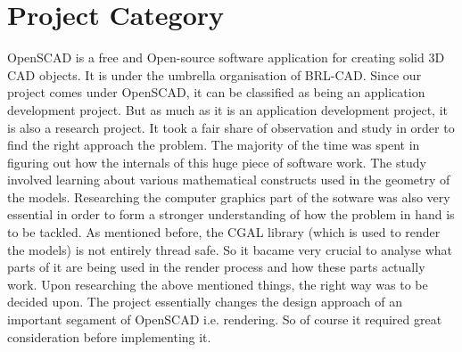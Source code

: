 \section{Project Category}
OpenSCAD is a free and Open-source software application for creating solid 3D CAD objects. It is under the umbrella organisation of BRL-CAD. Since our project comes under OpenSCAD, it can be classified as being an application development project. But as much as it is an application development project, it is also a research project. It took a fair share of observation and study in order to find the right approach the problem. The majority of the time was spent in figuring out how the internals of this huge piece of software work. The study involved learning about various mathematical constructs used in the geometry of the models. Researching the computer graphics part of the sotware was also very essential in order to form a stronger understanding of how the problem in hand is to be tackled. As mentioned before, the CGAL library (which is used to render the models) is not entirely thread safe. So it bacame very crucial to analyse what parts of it are being used in the render process and how these parts actually work.
Upon researching the above mentioned things, the right way was to be decided upon. The project essentially changes the design approach of an important segament of OpenSCAD i.e. rendering. So of course it required great consideration before implementing it.

